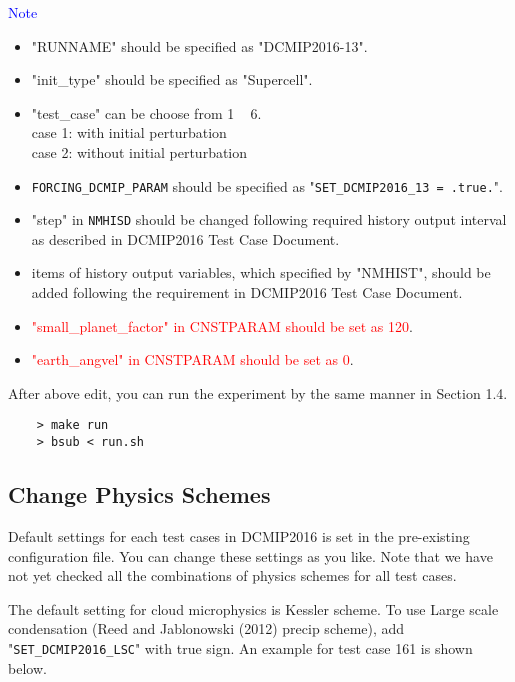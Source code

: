  \noindent \textcolor{blue}{{\sf Note}}
 \begin{itemize}
   \item "RUNNAME" should be specified as "DCMIP2016-13".
   \item "init\_type" should be specified as "Supercell".
   \item "test\_case" can be choose from 1 ~ 6.\\
          case 1: with initial perturbation \\
          case 2: without initial perturbation
   \item \verb|FORCING_DCMIP_PARAM| should be specified as "\verb|SET_DCMIP2016_13 = .true.|".
   \item "step" in \verb|NMHISD| should be changed following required history output interval
           as described in DCMIP2016 Test Case Document.
   \item items of history output variables, which specified by "NMHIST", should be added
         following the requirement in DCMIP2016 Test Case Document.
   \item \textcolor{red}{"small\_planet\_factor" in CNSTPARAM should be set as 120}.
   \item \textcolor{red}{"earth\_angvel" in CNSTPARAM should be set as 0}.
 \end{itemize}

 \noindent After above edit, you can run the experiment
 by the same manner in Section 1.4.
 \begin{verbatim}
    > make run
    > bsub < run.sh
 \end{verbatim}


\subsection{Change Physics Schemes}
 \noindent Default settings for each test cases in DCMIP2016 is set
 in the pre-existing configuration file. You can change these settings
 as you like. Note that we have not yet checked all the combinations of
 physics schemes for all test cases. \\



 \noindent The default setting for cloud microphysics is Kessler scheme.
 To use Large scale condensation (Reed and Jablonowski (2012) precip scheme),
 add "\verb|SET_DCMIP2016_LSC|" with true sign. An example for test case 161
 is shown below.

